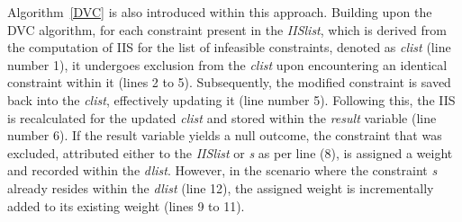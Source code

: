     
    
        Algorithm~\ref{DVC} is also introduced within this approach. Building upon the DVC algorithm, for each constraint present in the \textit{IIS\textunderscore list}, which is derived from the computation of IIS for the list of infeasible constraints, denoted as \textit{c\textunderscore list} (line number 1), it undergoes exclusion from the \textit{c\textunderscore list} upon encountering an identical constraint within it (lines 2 to 5). Subsequently, the modified constraint is saved back into the \textit{c\textunderscore list}, effectively updating it (line number 5).
        Following this, the IIS is recalculated for the updated \textit{c\textunderscore list} and stored within the \textit{result} variable (line number 6). If the result variable yields a null outcome, the constraint that was excluded, attributed either to the \textit{IIS\textunderscore list} or \textit{s} as per line (8), is assigned a weight and recorded within the \textit{d\textunderscore list}. However, in the scenario where the constraint \textit{s} already resides within the \textit{d\textunderscore list} (line 12), the assigned weight is incrementally added to its existing weight (lines 9 to 11).
        
